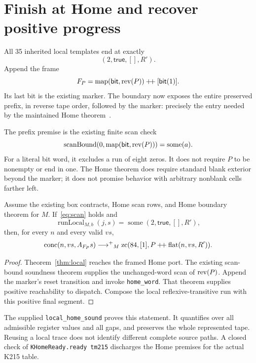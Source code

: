 \section{Finish at Home and recover positive progress}
All 35 inherited local templates end at exactly
\[
 (2,\mathsf{true},[],R').
\]
Append the frame
\[
 F_P=\operatorname{map}(\mathsf{bit},\operatorname{rev}(P))
            \mathbin{+\!+}[\mathsf{bit}(1)].
\]
Its last bit is the existing marker. The boundary now exposes the entire preserved prefix, in reverse tape order, followed by the marker: precisely the entry needed by the maintained Home theorem~\cite{home}.

The prefix premise is the existing finite scan check
\begin{equation}\label{eq:scan}
 \operatorname{scanBound}(0,\operatorname{map}(\mathsf{bit},\operatorname{rev}(P)))
 =\operatorname{some}(a).
\end{equation}
For a literal bit word, it excludes a run of eight zeros. It does not require $P$ to be nonempty or end in one. The Home theorem does require standard blank exterior beyond the marker; it does not promise behavior with arbitrary nonblank cells farther left.

\begin{theorem}\label{thm:home}
Assume the existing box contracts, Home scan rows, and Home boundary theorem for $M$. If~\eqref{eq:scan} holds and
\[
 \operatorname{runLocal}_{M,b}(j,s)
 =\operatorname{some}(2,\mathsf{true},[],R'),
\]
then, for every $n$ and every valid $vs$,
\[
 \operatorname{conc}(n,vs,A_{F_P}s)
 \mathrel{\longrightarrow^{+}}_M
 \operatorname{zc}(84,[1],P\mathbin{+\!+}\operatorname{flat}(n,vs,R')).
\]
\end{theorem}
\begin{proof}
Theorem~\ref{thm:local} reaches the framed Home port. The existing scan-bound soundness theorem supplies the unchanged-word scan of $\operatorname{rev}(P)$. Append the marker's reset transition and invoke \texttt{home\_word}. That theorem supplies positive reachability to dispatch. Compose the local reflexive-transitive run with this positive final segment.
\end{proof}

The supplied \texttt{local\_home\_sound} proves this statement. It quantifies over all admissible register values and all gaps, and preserves the whole represented tape. Reusing a local trace does not identify different complete source paths. A closed check of \texttt{KHomeReady.ready tm215} discharges the Home premises for the actual K215 table.

